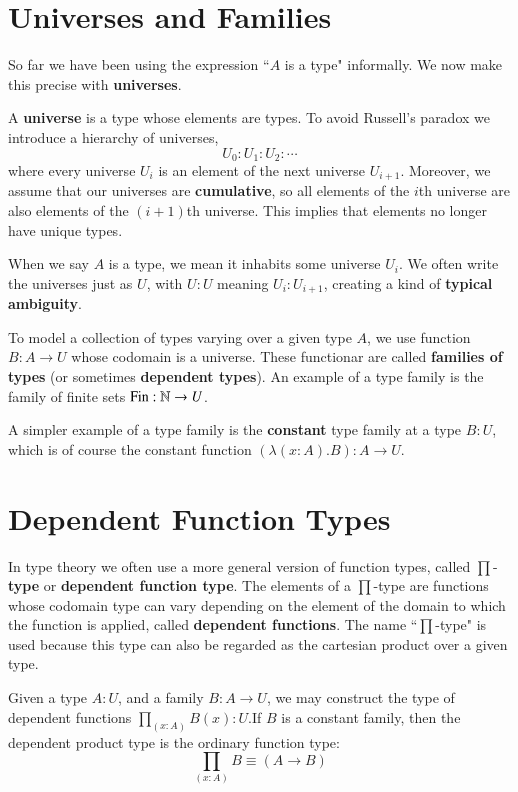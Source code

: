 \section{Universes and Families}

So far we have been using the expression ``$A$ is a type" informally. We now make this precise with \textbf{universes}.

\begin{definition}
    A \textbf{universe} is a type whose elements are types. To avoid Russell's paradox we introduce a hierarchy of universes, $$U_0:U_1:U_2:\cdots$$
    where every universe $U_i$ is an element of the next universe $U_{i+1}$. Moreover, we assume that our universes are \textbf{cumulative}, so all elements of the $i$th universe are also elements of the $(i+1)$th universe. This implies that elements no longer have unique types.
\end{definition}
When we say $A$ is a type, we mean it inhabits some universe $U_i$. We often write the universes just as $U$, with $U:U$ meaning $U_i:U_{i+1}$, creating a kind of \textbf{typical ambiguity}.

To model a collection of types varying over a given type $A$, we use function $B:A\rightarrow U$ whose codomain is a universe. These functionar are called \textbf{families of types} (or sometimes \textbf{dependent types}). An example of a type family is the family of finite sets $\text{Fin}:\mathbb N\rightarrow U$.

A simpler example of a type family is the \textbf{constant} type family at a type $B:U$, which is of course the constant function $(\lambda(x:A).B):A\rightarrow U$.

\section{Dependent Function Types}

In type theory we often use a more general version of function types, called $\prod$-\textbf{type} or \textbf{dependent function type}. The elements of a $\prod$-type are functions whose codomain type can vary depending on the element of the domain to which the function is applied, called \textbf{dependent functions}. The name ``$\prod$-type" is used because this type can also be regarded as the cartesian product over a given type.

\begin{definition}
    Given a type $A:U$, and a family $B:A\rightarrow U$, we may construct the type of dependent functions $\prod_{(x:A)}B(x):U$.If $B$ is a constant family, then the dependent product type is the ordinary function type: $$\prod_{(x:A)}B\equiv (A\rightarrow B)$$
\end{definition}

